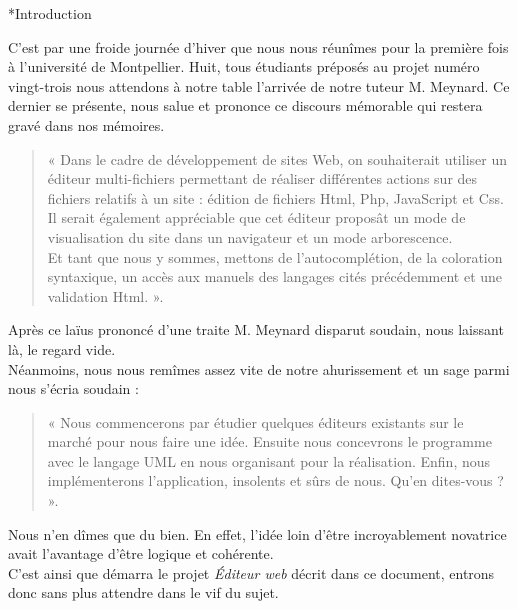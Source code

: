 \documentclass[a4paper, 12pt]{report}
\begin{document}
	\begin{chapter}*{Introduction}

	C'est par une froide journée d'hiver que nous nous réunîmes pour la première fois à l'université de Montpellier. 
	Huit, tous étudiants préposés au projet numéro vingt-trois nous attendons à notre table l'arrivée de notre tuteur M. Meynard. 
	Ce dernier se présente, nous salue et prononce ce discours mémorable qui restera gravé dans nos mémoires.\\
	\begin{quotation}
		« Dans le cadre de développement de sites Web, on souhaiterait utiliser un éditeur multi-fichiers permettant de réaliser 
		différentes actions sur	des fichiers relatifs à un site : édition de fichiers \gls{Html}, \gls{Php}, \gls{JavaScript} et \gls{Css}.\\

		Il serait également appréciable que cet éditeur proposât un mode de visualisation du site dans un navigateur et un mode arborescence.\\

		Et tant que nous y sommes, mettons de l'\gls{autocomplétion}, de la coloration syntaxique, un accès aux manuels
		des langages cités précédemment et une validation \gls{Html}. ».
	\end{quotation}

	Après ce laïus prononcé d'une traite M. Meynard disparut soudain, nous laissant là, le regard vide.\\


	Néanmoins, nous nous remîmes assez vite de notre ahurissement et un sage parmi nous s'écria soudain :
	\begin{quotation}
		« Nous commencerons par étudier quelques éditeurs existants sur le marché pour nous faire une idée. Ensuite nous concevrons
		le programme avec le langage UML en nous organisant pour la réalisation.
		Enfin, nous implémenterons l'application, insolents et sûrs de nous.	Qu'en dites-vous ? ».
	\end{quotation}

	Nous n'en dîmes que du bien. En effet, l'idée loin d'être incroyablement novatrice avait l'avantage d'être logique et cohérente.\\


	C'est ainsi que démarra le projet \emph{Éditeur web} décrit dans ce document, entrons donc sans plus attendre dans le vif du sujet.
	
	\end{chapter}
\end{document}
